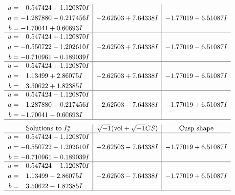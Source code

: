 \documentclass[1p]{elsarticle_modified}
\theoremstyle{definition}
\newcommand{\I}{\sqrt{-1}}
\begin{document}
$$\begin{array}{c|c|c}
\begin{aligned}
u &= \phantom{-}0.547424 + 1.120870 I \\
a &= -1.287880 - 0.217456 I \\
b &= -1.70041 + 0.60693 I\end{aligned}
 & -2.62503 + 7.64338 I & -1.77019 - 6.51087 I \\ \hline\begin{aligned}
u &= \phantom{-}0.547424 + 1.120870 I \\
a &= -0.550722 - 1.202610 I \\
b &= -0.710961 - 0.189039 I\end{aligned}
 & -2.62503 + 7.64338 I & -1.77019 - 6.51087 I \\ \hline\begin{aligned}
u &= \phantom{-}0.547424 + 1.120870 I \\
a &= \phantom{-}1.13499 + 2.86075 I \\
b &= \phantom{-}3.50622 + 1.82385 I\end{aligned}
 & -2.62503 + 7.64338 I & -1.77019 - 6.51087 I \\ \hline\begin{aligned}
u &= \phantom{-}0.547424 - 1.120870 I \\
a &= -1.287880 + 0.217456 I \\
b &= -1.70041 - 0.60693 I\end{aligned}
 & -2.62503 - 7.64338 I & -1.77019 + 6.51087 I\\
 \hline 
 \end{array}$$\newpage$$\begin{array}{c|c|c}  
\text{Solutions to }I^u_{2}& \I (\text{vol} + \sqrt{-1}CS) & \text{Cusp shape}\\
 \hline 
\begin{aligned}
u &= \phantom{-}0.547424 - 1.120870 I \\
a &= -0.550722 + 1.202610 I \\
b &= -0.710961 + 0.189039 I\end{aligned}
 & -2.62503 - 7.64338 I & -1.77019 + 6.51087 I \\ \hline\begin{aligned}
u &= \phantom{-}0.547424 - 1.120870 I \\
a &= \phantom{-}1.13499 - 2.86075 I \\
b &= \phantom{-}3.50622 - 1.82385 I\end{aligned}
 & -2.62503 - 7.64338 I & -1.77019 + 6.51087 I\\
 \hline 
 \end{array}$$\newpage\newpage\renewcommand{\arraystretch}{1}
\end{document}
